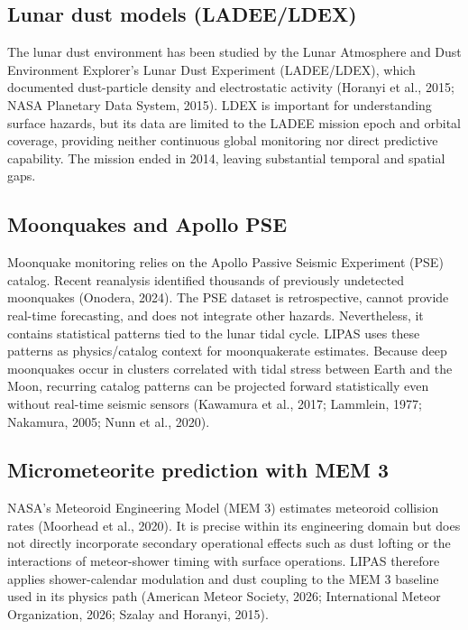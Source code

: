 \subsection{Lunar dust models (LADEE/LDEX)}

The lunar dust environment has been studied by the Lunar Atmosphere and Dust Environment Explorer's Lunar Dust Experiment (LADEE/LDEX), which documented dust-particle density and electrostatic activity (Horanyi et al., 2015; NASA Planetary Data System, 2015). LDEX is important for understanding surface hazards, but its data are limited to the LADEE mission epoch and orbital coverage, providing neither continuous global monitoring nor direct predictive capability. The mission ended in 2014, leaving substantial temporal and spatial gaps.

\subsection{Moonquakes and Apollo PSE}

Moonquake monitoring relies on the Apollo Passive Seismic Experiment (PSE) catalog. Recent reanalysis identified thousands of previously undetected moonquakes (Onodera, 2024). The PSE dataset is retrospective, cannot provide real-time forecasting, and does not integrate other hazards. Nevertheless, it contains statistical patterns tied to the lunar tidal cycle. LIPAS uses these patterns as physics/catalog context for moonquakerate estimates. Because deep moonquakes occur in clusters correlated with tidal stress between Earth and the Moon, recurring catalog patterns can be projected forward statistically even without real-time seismic sensors (Kawamura et al., 2017; Lammlein, 1977; Nakamura, 2005; Nunn et al., 2020).

\subsection{Micrometeorite prediction with MEM 3}

NASA's Meteoroid Engineering Model (MEM 3) estimates meteoroid collision rates (Moorhead et al., 2020). It is precise within its engineering domain but does not directly incorporate secondary operational effects such as dust lofting or the interactions of meteor-shower timing with surface operations. LIPAS therefore applies shower-calendar modulation and dust coupling to the MEM 3 baseline used in its physics path (American Meteor Society, 2026; International Meteor Organization, 2026; Szalay and Horanyi, 2015).

